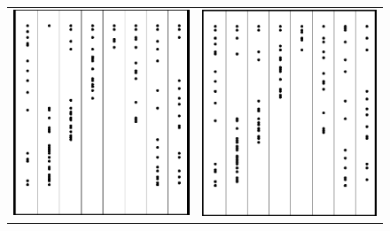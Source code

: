 \documentclass[a4paper, 11pt]{article}
\begin{document}
\begin{figure}[H]
\begin{center}
\begin{tabular}{c c}
\includegraphics[scale=0.25]{Images/4By8MidTriOne.png} & \includegraphics[scale=0.25]{Images/4By8MidTriTwo.png}

\end{tabular}
\end{center}
\end{figure}
\end{document}
